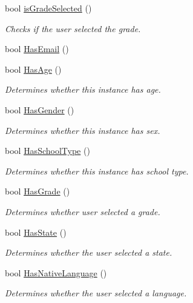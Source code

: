 \begin{DoxyCompactItemize}
bool \hyperlink{classRegisterController_a63d41cc83568f2a3aa0159acf51bf265}{is\+Grade\+Selected} ()
\begin{DoxyCompactList}\small\item\em Checks if the user selected the grade. \end{DoxyCompactList}\item 
bool \hyperlink{classRegisterController_a963f94012946979c3c9c85adf9f8efb9}{Has\+Email} ()
\item 
bool \hyperlink{classRegisterController_a2442b0771f689d2a974c65fd7d756874}{Has\+Age} ()
\begin{DoxyCompactList}\small\item\em Determines whether this instance has age. \end{DoxyCompactList}\item 
bool \hyperlink{classRegisterController_a6c0e18d451f9960d33d798e12c1fd6d0}{Has\+Gender} ()
\begin{DoxyCompactList}\small\item\em Determines whether this instance has sex. \end{DoxyCompactList}\item 
bool \hyperlink{classRegisterController_a9641e09116e823648addfc362af8fb24}{Has\+School\+Type} ()
\begin{DoxyCompactList}\small\item\em Determines whether this instance has school type. \end{DoxyCompactList}\item 
bool \hyperlink{classRegisterController_ace91b2c3a079dbe729ece56c3e4a1552}{Has\+Grade} ()
\begin{DoxyCompactList}\small\item\em Determines whether user selected a grade. \end{DoxyCompactList}\item 
bool \hyperlink{classRegisterController_aa5c83aee5c268b2338d29a9f1fd0282f}{Has\+State} ()
\begin{DoxyCompactList}\small\item\em Determines whether the user selected a state. \end{DoxyCompactList}\item 
bool \hyperlink{classRegisterController_ab107f3182247b1b6f62ba81278dba550}{Has\+Native\+Language} ()
\begin{DoxyCompactList}\small\item\em Determines whether the user selected a language. \end{DoxyCompactList}\item 

\end{DoxyCompactItemize}
